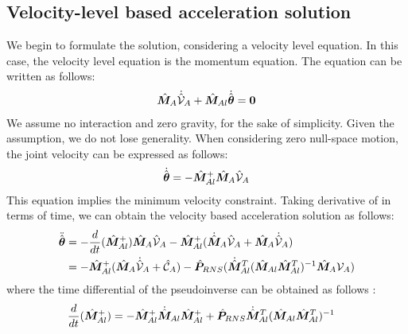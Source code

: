 \subsection{Velocity-level based acceleration solution}
We begin to formulate the solution, considering a velocity level equation.
In this case, the velocity level equation is the momentum equation.
The equation can be written as follows:
%
\begin{align}
  {\hat{\bm{M}}}_{A}\dot{\hat{\mathcal{V}}}_{A} + {\hat{\bm{M}}}_{Al}{\dot{\hat{\bm{\theta}}}} = \bm{0}
\end{align}
%
We assume no interaction and zero gravity, for the sake of simplicity.
Given the assumption, we do not lose generality.
When considering zero null-space motion,
the joint velocity can be expressed as follows:
%
\begin{align}
  {\dot{\hat{\bm{\theta}}}} = -{\hat{\bm{M}}}_{Al}^{+}{\hat{\bm{M}}}_{A}\hat{\mathcal{V}}_{A}\label{eq:VEL_SOL}
\end{align}
%
This equation implies the minimum velocity constraint.
Taking derivative of  in terms of time,
we can obtain the velocity based acceleration solution as follows:
%
\begin{align}
  {\ddot{\hat{\bm{\theta}}}} &= -{\frac{d}{dt}}({\hat{\bm{M}}}_{Al}^{+}){\hat{\bm{M}}}_{A}\hat{\mathcal{V}}_{A} - {\hat{\bm{M}}}_{Al}^{+}(\dot{{\hat{\bm{M}}}}_{A}\hat{\mathcal{V}}_{A}
  + {\hat{\bm{M}}}_{A}\dot{\hat{\mathcal{V}}}_{A}) \notag \\
  &= -{\hat{\bm{M}}}_{Al}^{+}({\hat{\bm{M}}}_{A}\dot{\hat{\mathcal{V}}}_{A} + \hat{\mathcal{C}}_{A})
  - {\hat{\bm{P}}}_{RNS}(\dot{{\hat{\bm{M}}}}_{Al}^{T}({\hat{\bm{M}}}_{Al}{\hat{\bm{M}}}_{Al}^{T})^{-1}{\hat{\bm{M}}}_{A}\mathcal{V}_{A})
  \label{eq:VEL_ACC_SOL}
\end{align}
%
where the time differential of the pseudoinverse can be obtained as follows \cite{Ma1996}:
%
\begin{align}
  {\frac{d}{dt}}({\hat{\bm{M}}}_{Al}^{+}) &= -{\hat{\bm{M}}}_{Al}^{+}\dot{{\hat{\bm{M}}}}_{Al}{\hat{\bm{M}}}_{Al}^{+} +
  {\hat{\bm{P}}}_{RNS}\dot{{\hat{\bm{M}}}}_{Al}^{T}({\hat{\bm{M}}}_{Al}{\hat{\bm{M}}}_{Al}^{T})^{-1}
\end{align}
%

